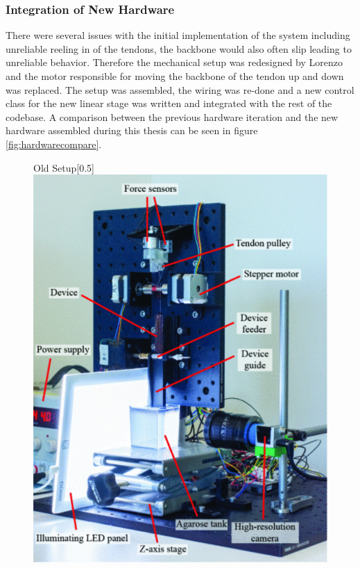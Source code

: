 \subsubsection{Integration of New Hardware}
There were several issues with the initial implementation of the system including unreliable reeling in of the tendons, the backbone would also often slip leading to unreliable behavior. Therefore the mechanical setup was redesigned by Lorenzo and the motor responsible for moving the backbone of the tendon up and down was replaced. The setup was assembled, the wiring was re-done and a new control class for the new linear stage was written and integrated with the rest of the codebase. A comparison between the previous hardware iteration and the new hardware assembled during this thesis can be seen in figure \ref{fig:hardwarecompare}.
\begin{figure}[H]
    \centering
    \begin{subcaptionbox}{Old Setup\label{fig:left}}[0.5\linewidth]
        {\includegraphics[width=\linewidth]{images/Hardware/old.PNG}}

\end{subcaptionbox}
\end{figure}
